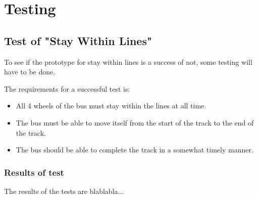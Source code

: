 \chapter{Testing}

\section{Test of "Stay Within Lines"}

To see if the prototype for stay within lines is a success of not, some testing will have to be done.

The requirements for a successful test is: 
\begin{itemize}
    \item All 4 wheels of the bus must stay within the lines at all time.
    \item The bus must be able to move itself from the start of the track to the end of the track.
    \item The bus should be able to complete the track in a somewhat timely manner.
\end{itemize}

\subsection{Results of test}
The results of the tests are blablabla...